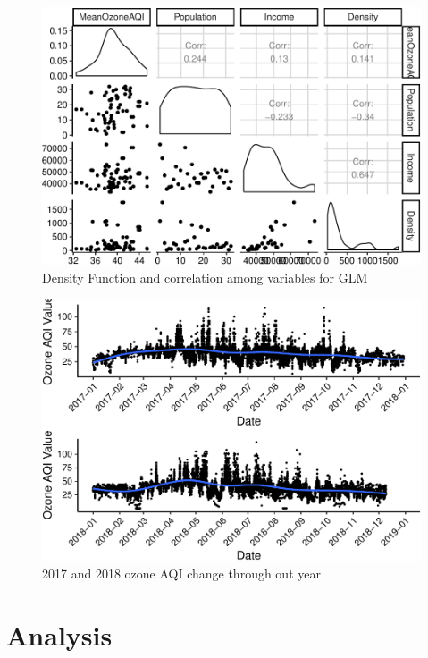 \documentclass[12pt,]{article}
\begin{document}
\begin{figure}
\centering
\includegraphics{Xia_ENV_872_Project_files/figure-latex/exploration 5-1.pdf}
\caption{Density Function and correlation among variables for GLM}
\end{figure}

\begin{figure}
\centering
\includegraphics{Xia_ENV_872_Project_files/figure-latex/exploration 6-1.pdf}
\caption{2017 and 2018 ozone AQI change through out year}
\end{figure}

\newpage

\section{Analysis}\label{analysis}
\end{document}
